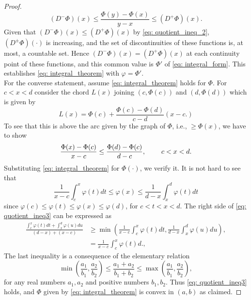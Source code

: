 \documentclass{article}
\theoremstyle{definition}
\begin{document}
\begin{proof}
\begin{equation}
(D^-\Phi)(x) \leq \frac{\Phi(y)-\Phi(x)}{y-x}\leq (D^+\Phi)(x).
\end{equation}
Given that $(D^-\Phi)(x)\leq (D^+\Phi)(x)$ by \eqref{eq: quotient_ineq_2}, $(D^{\pm}\Phi)(\cdot)$ is increasing, and the set of discontinuities of these functions is, at most, a countable set. Hence $(D^-\Phi)(x)=(D^+\Phi)(x)$ at each continuity point of these functions, and this common value is $\Phi'$ of \eqref{eq: integral_form}. This establishes \eqref{eq: integral_theorem} with $\varphi=\Phi'$.\\
For the converse statement, assume \eqref{eq: integral_theorem} holds for $\Phi$. For $c <x < d$ consider the chord $L(x)$ joining $(c,\Phi(c))$ and $(d, \Phi(d))$ which is
given by
$$L(x)=\Phi(c)+\frac{\Phi(c)-\Phi(d)}{c-d}(x-c.)$$
To see that this is above the arc given by the graph of $\Phi$, i.e., $\geq \Phi(x)$, we have to show
\begin{equation}\label{eq: quotient_ineq3}
\frac{\Phi(x)-\Phi(c)}{x-c}\leq \frac{\Phi(d)-\Phi(c)}{d-c}, \hspace{8mm} c<x<d.
\end{equation}
Substituting \eqref{eq: integral_theorem} for $\Phi(\cdot)$, we verify it. It is not hard to see that
\begin{equation}
\frac{1}{x-c}\int_c^x\varphi(t)dt \leq \varphi(x) \leq \frac{1}{d-x}\int_x^d\varphi(t)dt
\end{equation}
since $\varphi(c) \leq \varphi(t)\leq \varphi(x) \leq \varphi(d)$, for $c < t < x < d$. The right side of \eqref{eq: quotient_ineq3} can be expressed as
\begin{equation*}
\begin{split}
\frac{\int_c^x\varphi(t)dt+\int_x^d\varphi(u)du}{(d-x)+(x-c)}&\geq\min \left(\frac{1}{x-c}\int_c^x\varphi(t)dt,\frac{1}{d-x}\int_x^d\varphi(u)du\right),\\
&=\frac{1}{x-c}\int_c^x\varphi(t)d.,
\end{split}
\end{equation*}
The last inequality is a consequence of the elementary relation
$$\min\left(\frac{a_1}{b_1},\frac{a_2}{b_2}\right)\leq \frac{a_1+a_2}{b_1+b_2}\leq\max\left(\frac{a_1}{b_1},\frac{a_2}{b_2}\right),$$
for any real numbers $a_1,a_2$ and positive numbers $b_1,b_2$. Thus \eqref{eq: quotient_ineq3} holds, and $\Phi$ given by \eqref{eq: integral_theorem} is convex in $(a, b)$ as claimed.
\end{proof}
\end{document}
